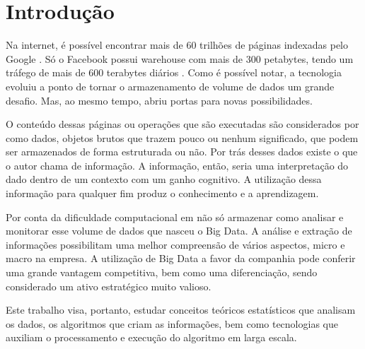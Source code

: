 \chapter*[Introdução]{Introdução}

Na internet, é possível encontrar mais de 60 trilhões de páginas indexadas pelo Google \cite{GOO01}. Só o Facebook possui warehouse com mais de 300 petabytes, tendo um tráfego de mais de 600 terabytes diários \cite{FAC01}. Como é possível notar, a tecnologia evoluiu a ponto de tornar o armazenamento de volume de dados um grande desafio. Mas, ao mesmo tempo, abriu portas para novas possibilidades.

O conteúdo dessas páginas ou operações que são executadas são considerados por  como dados, objetos brutos que trazem pouco ou nenhum significado, que podem ser armazenados de forma estruturada ou não. Por trás desses dados existe o que o autor chama de informação. A informação, então, seria uma interpretação do dado dentro de um contexto com um ganho cognitivo. A utilização dessa informação para qualquer fim produz o conhecimento e a aprendizagem.

Por conta da dificuldade computacional em não só armazenar como analisar e monitorar esse volume de dados que nasceu o Big Data. A análise e extração de informações possibilitam uma melhor compreensão de vários aspectos, micro e macro na empresa. A utilização de Big Data a favor da companhia pode conferir uma grande vantagem competitiva, bem como uma diferenciação, sendo considerado um ativo estratégico muito valioso.

Este trabalho visa, portanto, estudar conceitos teóricos estatísticos que analisam os dados, os algoritmos que criam as informações, bem como tecnologias que auxiliam o processamento e execução do algoritmo em larga escala.
